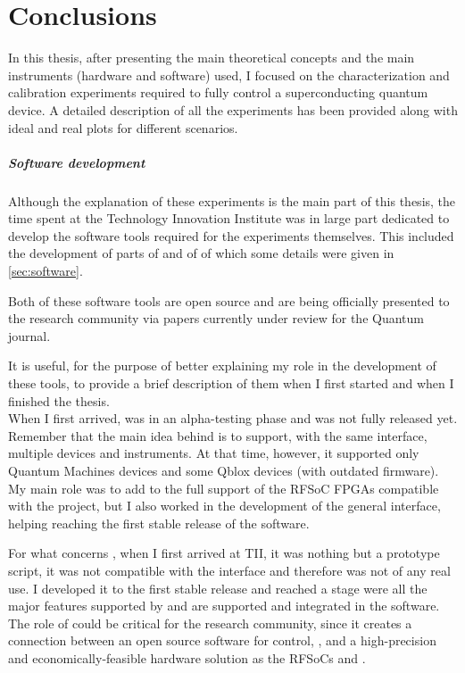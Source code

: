 


\chapter{Conclusions}

In this thesis, after presenting the main theoretical concepts and the main instruments (hardware and software) used, I focused on the characterization and calibration experiments required to fully control a superconducting quantum device.
A detailed description of all the experiments has been provided along with ideal and real plots for different scenarios.

\paragraph{Software development}

Although the explanation of these experiments is the main part of this thesis, the time spent at the Technology Innovation Institute was in large part dedicated to develop the software tools required for the experiments themselves.
This included the development of parts of \Qibolab and of \Qibosoq of which some details were given in \cref{sec:software}.

Both of these software tools are open source and are being officially presented to the research community via papers \cite{Efthymiou_2023} currently under review for the Quantum journal.

It is useful, for the purpose of better explaining my role in the development of these tools, to provide a brief description of them when I first started and when I finished the thesis.\\
When I first arrived, \Qibolab was in an alpha-testing phase and was not fully released yet.
Remember that the main idea behind \Qibolab is to support, with the same interface, multiple devices and instruments.
At that time, however, it supported only Quantum Machines devices and some Qblox devices (with outdated firmware).
My main role was to add to \Qibolab the full support of the RFSoC FPGAs compatible with the \Qick project, but I also worked in the development of the general interface, helping reaching the first stable release of the software.

For what concerns \Qibosoq, when I first arrived at TII, it was nothing but a prototype script, it was not compatible with the \Qibolab interface and therefore was not of any real use.
I developed it to the first stable release and reached a stage were all the major features supported by \Qick and \Qibolab are supported and integrated in the software.\\
The role of \Qibosoq could be critical for the research community, since it creates a connection between an open source software for control, \Qibolab, and a high-precision and economically-feasible hardware solution as the RFSoCs and \Qick.

